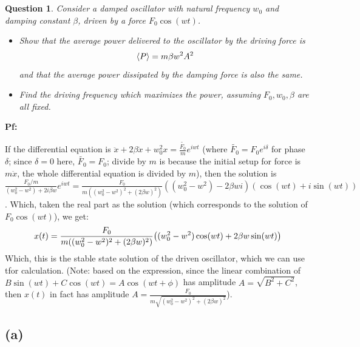\documentclass{article}
\newtheorem{question}{Question}
\DeclarePairedDelimiter{\paran}{(}{)}%
\DeclarePairedDelimiter{\bracket}{\langle}{\rangle}
\begin{document}
\break

\section{}
\begin{question}\label{q3}
    Consider a damped oscillator with natural frequency $w_0$ and damping constant $\beta$, driven by a force $F_0\cos(wt)$.
    \begin{itemize}
        \item[(a)] Show that the average power delivered to the oscillator by the driving force is 
        $$\bracket*{P}=m\beta w^2A^2$$
        and that the average power dissipated by the damping force is also the same.
        \item[(b)] Find the driving frequency which maximizes the power, assuming $F_0, w_0, \beta$ are all fixed.
    \end{itemize}
\end{question}

\textbf{Pf:}

If the differential equation is $\ddot x+2\beta \dot x + w_0^2x = \frac{\tilde{F_0}}{m}e^{iwt}$ (where $\tilde{F_0}=F_0e^{i\delta}$ for phase $\delta$; since $\delta=0$ here, $\tilde{F_0}=F_0$; divide by $m$ is because the initial setup for force is $m\ddot x$, the whole differential equation is divided by $m$), then the solution is $\frac{F_0/m}{(w_0^2-w^2)+2i\beta w}e^{iwt} = \frac{F_0}{m((w_0^2-w^2)^2+(2\beta w)^2)}((w_0^2-w^2)-2\beta wi)(\cos(wt)+i\sin(wt))$. Which, taken the real part as the solution (which corresponds to the solution of $F_0\cos(wt)$), we get:
\begin{equation}
    x(t) = \frac{F_0}{m((w_0^2-w^2)^2+(2\beta w)^2)}\paran*{(w_0^2-w^2)\cos(wt)+2\beta w\sin(wt)}
\end{equation}
Which, this is the stable state solution of the driven oscillator, which we can use tfor calculation. (Note: based on the expression, since the linear combination of $B\sin(wt)+C\cos(wt)=A\cos(wt+\phi)$ has amplitude $A=\sqrt{B^2+C^2}$, then $x(t)$ in fact has amplitude $A=\frac{F_0}{m\sqrt{(w_0^2-w^2)^2+(2\beta w)^2}}$).

\subsection*{(a)}
\end{document}
